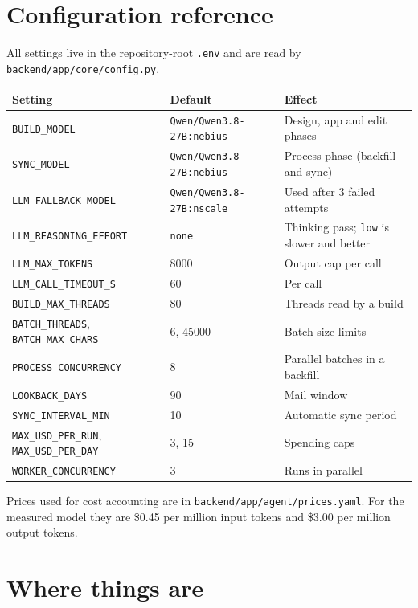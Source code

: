\documentclass[10pt,a4paper]{article}
\newcommand{\code}[1]{\texttt{\small #1}}
\newcommand{\file}[1]{\texttt{\small #1}}
\newcommand{\usd}[1]{\$#1}
\begin{document}
\appendix
\section{Configuration reference}

All settings live in the repository-root \code{.env} and are read by
\file{backend/app/core/config.py}.

\begin{center}\small
\begin{tabularx}{\linewidth}{@{}P{4.6cm}P{4.4cm}L@{}}
\toprule
\textbf{Setting} & \textbf{Default} & \textbf{Effect} \\
\midrule
\code{BUILD\_MODEL} & \code{Qwen/Qwen3.8-27B:nebius} & Design, app and edit phases \\
\code{SYNC\_MODEL} & \code{Qwen/Qwen3.8-27B:nebius} & Process phase (backfill and sync) \\
\code{LLM\_FALLBACK\_MODEL} & \code{Qwen/Qwen3.8-27B:nscale} & Used after 3 failed attempts \\
\code{LLM\_REASONING\_EFFORT} & \code{none} & Thinking pass; \code{low} is slower and better \\
\code{LLM\_MAX\_TOKENS} & 8000 & Output cap per call \\
\code{LLM\_CALL\_TIMEOUT\_S} & 60 & Per call \\
\code{BUILD\_MAX\_THREADS} & 80 & Threads read by a build \\
\code{BATCH\_THREADS}, \code{BATCH\_MAX\_CHARS} & 6, 45000 & Batch size limits \\
\code{PROCESS\_CONCURRENCY} & 8 & Parallel batches in a backfill \\
\code{LOOKBACK\_DAYS} & 90 & Mail window \\
\code{SYNC\_INTERVAL\_MIN} & 10 & Automatic sync period \\
\code{MAX\_USD\_PER\_RUN}, \code{MAX\_USD\_PER\_DAY} & 3, 15 & Spending caps \\
\code{WORKER\_CONCURRENCY} & 3 & Runs in parallel \\
\bottomrule
\end{tabularx}
\end{center}

Prices used for cost accounting are in \file{backend/app/agent/prices.yaml}. For the measured
model they are \usd{0.45} per million input tokens and \usd{3.00} per million output tokens.

\section{Where things are}
\end{document}
